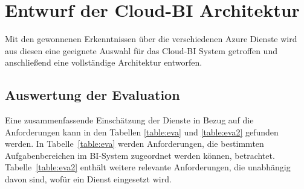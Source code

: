 \section{Entwurf der Cloud-BI Architektur} \label{sec:entwurfBIArchitektur}
Mit den gewonnenen Erkenntnissen über die verschiedenen Azure Dienste wird aus diesen eine geeignete Auswahl für das Cloud-BI System getroffen und anschließend eine vollständige Architektur entworfen.

\subsection{Auswertung der Evaluation} \label{sec:konzeption:evaAuswertung}
 Eine zusammenfassende Einschätzung der Dienste in Bezug auf die Anforderungen kann in den Tabellen \ref{table:eva} und \ref{table:eva2} gefunden werden. In Tabelle~\ref{table:eva} werden Anforderungen, die bestimmten Aufgabenbereichen im BI-System zugeordnet werden können, betrachtet. Tabelle~\ref{table:eva2} enthält weitere relevante Anforderungen, die unabhängig davon sind, wofür ein Dienst eingesetzt wird.
 
